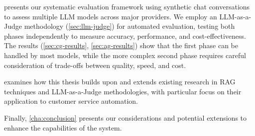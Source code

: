  presents our systematic evaluation framework using synthetic chat conversations to assess multiple LLM models across major providers.
We employ an LLM-as-a-Judge methodology (\cref{sec:llm-judge}) for automated evaluation, testing both phases independently to measure accuracy, performance, and cost-effectiveness.
The results (\cref{sec:cg-results}, \cref{sec:ag-results}) show that the first phase can be handled by most models, while the more complex second phase requires careful consideration of trade-offs between quality, speed, and cost.

 examines how this thesis builds upon and extends existing research in RAG techniques and LLM-as-a-Judge methodologies, with particular focus on their application to customer service automation.

Finally, \cref{cha:conclusion} presents our considerations and potential extensions to enhance the capabilities of the system.
